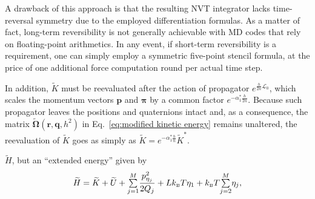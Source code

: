\documentclass[
journal=jctcce,
layout=twocolumn
]{achemso}
\newcommand{\vt}[1]{\boldsymbol{\mathbf{#1}}}   %
\newcommand{\Liu}[1]{i\!L_\text{#1}}            %
\newcommand{\timestep}{h}
\newcommand{\modified}[1]{\widetilde{#1}}
\begin{document}

A drawback of this approach is that the resulting NVT integrator lacks time-reversal symmetry due to the employed differentiation formulas.
As a matter of fact, long-term reversibility is not generally achievable with MD codes that rely on floating-point arithmetics.
In any event, if short-term reversibility is a requirement, one can simply employ a symmetric five-point stencil formula, at the price of one additional force computation round per actual time step.

In addition, $\modified K$ must be reevaluated after the action of propagator $e^{\frac{\timestep}{2n} {\mathcal L}_0}$, which scales the momentum vectors $\vt p$ and $\vt \pi$ by a common factor $e^{-\alpha_1^\ast \frac{\timestep}{2n}}$.
Because such propagator leaves the positions and quaternions intact and, as a consequence, the matrix $\modified{\mathbf \Omega}(\vt r, \vt q, \timestep^2)$ in Eq.~\eqref{eq:modified kinetic energy} remains unaltered, the reevaluation of $\modified K$ goes as simply as ${\modified K} = e^{-\alpha_1^\ast \frac{\timestep}{n}} {\modified K}^\ast$.

$\widetilde{H}$, but an ``extended energy'' given by \cite{Martyna_1992}
\begin{equation}
\label{eq:this extended energy}
\widetilde{H} = \modified K + \modified U + {\textstyle\sum\limits_{j=1}^{M}} \frac{p_{\eta_j}^2}{2Q_j} + L k_\text{\tiny B} T\eta_1 + k_\text{\tiny B} T {\textstyle\sum\limits_{j=2}^{M}} \eta_j,
\end{equation}
\end{document}
